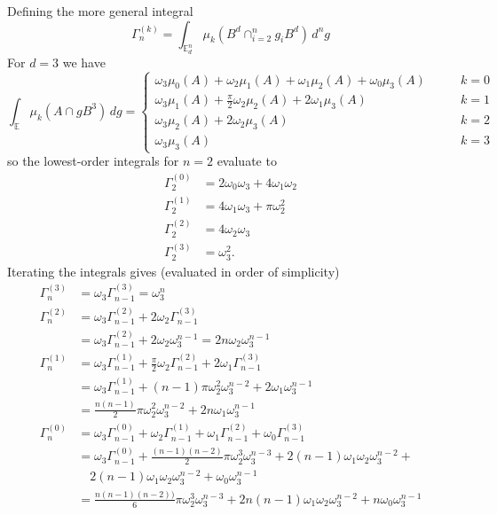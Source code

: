 \documentclass[11pt]{report}
\begin{document}
Defining the more general integral
\begin{equation}
  \Gamma_n^{(k)} = \int_{\mathbb{E}_d^n} \mu_k (B^d \cap_{i=2}^n g_i B^d) \, d^n g
\end{equation}
For $d=3$ we have
\begin{equation}
  \int_{\mathbb{E}} \mu_k (A \cap g B^3) \, dg =
  \begin{cases}
    \omega_3 \mu_0(A) + \omega_2 \mu_1(A) +
    \omega_1 \mu_2(A) + \omega_0 \mu_3(A)
    & \qquad k=0 \\
    \omega_3 \mu_1(A) + \frac{\pi}{2} \omega_2 \mu_2(A)
    + 2 \omega_1 \mu_3(A)
    & \qquad k=1 \\
    \omega_3 \mu_2(A) + 2 \omega_2 \mu_3(A) & \qquad k=2 \\
    \omega_3 \mu_3(A) & \qquad k=3
  \end{cases}
\end{equation}
so the lowest-order integrals for $n=2$ evaluate to
\begin{align}
  \Gamma_2^{(0)} &= 2 \omega_0 \omega_3 + 4 \omega_1 \omega_2 \\
  \Gamma_2^{(1)} &= 4 \omega_1 \omega_3 + \pi \omega_2^2 \\
  \Gamma_2^{(2)} &= 4 \omega_2 \omega_3 \\
  \Gamma_2^{(3)} &= \omega_3^2.
\end{align}
Iterating the integrals gives (evaluated in order of simplicity)
\begin{align}
  \Gamma_n^{(3)} &=
  \omega_3 \Gamma_{n-1}^{(3)}
  = \omega_3^n \\
  \Gamma_n^{(2)} &=
  \omega_3 \Gamma_{n-1}^{(2)} + 2 \omega_2 \Gamma_{n-1}^{(3)}
  \nonumber \\ &=
  \omega_3 \Gamma_{n-1}^{(2)} + 2 \omega_2 \omega_3^{n-1}
  = 2 n \omega_2 \omega_3^{n-1} \\
  \Gamma_n^{(1)} &=
  \omega_3 \Gamma_{n-1}^{(1)} +
  \frac{\pi}{2} \omega_2 \Gamma_{n-1}^{(2)} +
  2 \omega_1 \Gamma_{n-1}^{(3)}
  \nonumber \\ &=
  \omega_3 \Gamma_{n-1}^{(1)} +
  (n-1) \pi \omega_2^2 \omega_3^{n-2} +
  2 \omega_1 \omega_3^{n-1}
  \nonumber \\ &=
  \frac{n(n-1)}{2} \pi \omega_2^2 \omega_3^{n-2} +
  2n \omega_1 \omega_3^{n-1}
  \\
  \Gamma_n^{(0)} &=
  \omega_3 \Gamma_{n-1}^{(0)} +
  \omega_2 \Gamma_{n-1}^{(1)} +
  \omega_1 \Gamma_{n-1}^{(2)} +
  \omega_0 \Gamma_{n-1}^{(3)}
  \nonumber \\ &=
  \omega_3 \Gamma_{n-1}^{(0)} +
  \frac{(n-1)(n-2)}{2} \pi \omega_2^3 \omega_3^{n-3} +
  2(n-1) \omega_1 \omega_2 \omega_3^{n-2} +
  \nonumber \\ & \quad
  2(n-1) \omega_1 \omega_2 \omega_3^{n-2} +
  \omega_0 \omega_3^{n-1}
  \nonumber \\ &=
  \frac{n(n-1)(n-2))}{6} \pi \omega_2^3 \omega_3^{n-3} +
  2 n(n-1) \omega_1 \omega_2 \omega_3^{n-2} +
  n \omega_0 \omega_3^{n-1}
\end{align}
\end{document}
